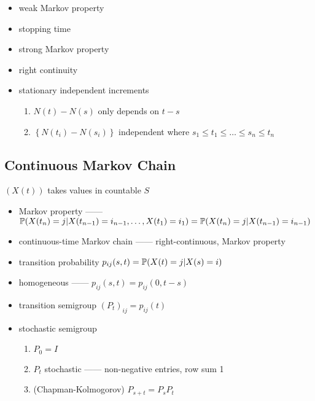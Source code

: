 \begin{itemize}
    \item weak Markov property
    \item stopping time
    \item strong Markov property
    \item right continuity
    \item stationary independent increments
    \begin{enumerate}
        \item $N(t) - N(s)$ only depends on $t - s$
        \item $\left\{ N(t_i) - N(s_i) \right\}$ independent where $s_1 \leq t_1 \leq \dots \leq s_n \leq t_n$
    \end{enumerate}
\end{itemize}

\subsection{Continuous Markov Chain}\label{subsec:continuous-markov-chain}

\begin{setting}
    $(X(t))$ takes values in countable $S$
\end{setting}

\begin{itemize}
    \item Markov property ------ \\$\mathbb{P}(X(t_n) = j|X(t_{n-1}) = i_{n-1}, \dots, X(t_1) = i_1) =\mathbb{P}(X(t_n) = j|X(t_{n-1}) = i_{n-1}) $
    \item continuous-time Markov chain ------ right-continuous, Markov property
    \item transition probability $p_{ij}(s, t) = \mathbb{P}(X(t) = j|X(s) = i)$
    \item homogeneous ------ $p_{ij}(s, t) = p_{ij}(0, t-s)$
    \item transition semigroup $(P_t)_{ij} = p_{ij}(t)$
    \item stochastic semigroup
    \begin{enumerate}
        \item $P_0 = I$
        \item $P_t$ stochastic ------ non-negative entries, row sum 1
        \item (Chapman-Kolmogorov) $P_{s+t} = P_s P_t$
    \end{enumerate}
\end{itemize}

